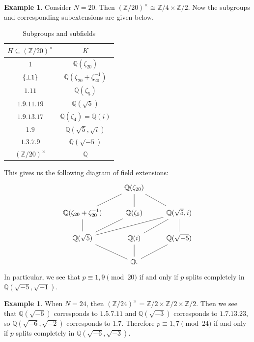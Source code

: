 \documentclass[leqno, openany]{memoir}
\theoremstyle{definition}
\newtheorem{exm}[thm]{Example}
\theoremstyle{remark}
\theoremstyle{plain}
\theoremstyle{definition}
\theoremstyle{remark}
\newcommand{\Z}{\mathbb{Z}}
\newcommand{\Q}{\mathbb{Q}}
\begin{document}
\begin{exm}
    Consider $N = 20$. Then ${(\Z/20)}^{\times} \cong \Z/4 \times \Z/2$. Now the subgroups and corresponding subextensions are given below.
    \begin{table}[H]
        \centering
        \caption{Subgroups and subfields}
        \label{tab:subgroups-subfields}
        \begin{tabular}{cc}
        \toprule
        $H \subseteq {(\Z/20)}^{\times}$ & $K$ \\
        \midrule
        $\qty{1}$ & $\Q(\zeta_{20})$ \\
        $\qty{\pm 1}$ & $\Q(\zeta_{20}+\zeta_{20}^{-1})$ \\
        $\qty{1,11}$ & $\Q(\zeta_5)$ \\
        $\qty{1,9,11,19}$ & $\Q(\sqrt{5})$ \\
        $\qty{1,9,13,17}$ & $\Q(\zeta_4) = \Q(i)$ \\
        $\qty{1,9}$ & $\Q(\sqrt{5}, \sqrt{i})$ \\
        $\qty{1,3,7,9}$ & $\Q(\sqrt{-5})$ \\
        ${(\Z/20)}^{\times}$ & $\Q$ \\
        \bottomrule
        \end{tabular}
    \end{table}
    This gives us the following diagram of field extensions:
    \begin{equation*}
    \begin{tikzcd}
        & \Q(\zeta_{20}) \ar[dash]{d} \ar[dash]{dl} \ar[dash]{dr} \\
        \Q(\zeta_{20} + \zeta_{20}^{-1}) \ar[dash]{d} & \Q(\zeta_5) \ar[dash]{dl} & \Q(\sqrt{5}, i) \ar[dash]{dll} \ar[dash]{dl} \ar[dash]{d} \\
        \Q(\sqrt{5}) \ar[dash]{dr} & \Q(i) \ar[dash]{d} & \Q(\sqrt{-5}) \ar[dash]{dl} \\
                                   & \Q.
    \end{tikzcd}
    \end{equation*}
    In particular, we see that $p \equiv 1,9 \pmod{20}$ if and only if $p$ splits completely in $\Q(\sqrt{-5}, \sqrt{-1})$.
\end{exm}

\begin{exm}
    When $N = 24$, then ${(\Z/24)}^{\times} = \Z/2 \times \Z/2 \times \Z/2$. Then we see that $\Q(\sqrt{-6})$ corresponds to $\qty{1,5,7,11}$ and $\Q(\sqrt{-3})$ corresponds to $\qty{1,7,13,23}$, so $\Q(\sqrt{-6}, \sqrt{-2})$ corresponds to $\qty{1,7}$. Therefore $p \equiv 1,7 \pmod{24}$ if and only if $p$ splits completely in $\Q(\sqrt{-6}, \sqrt{-3})$.
\end{exm}
\end{document}
